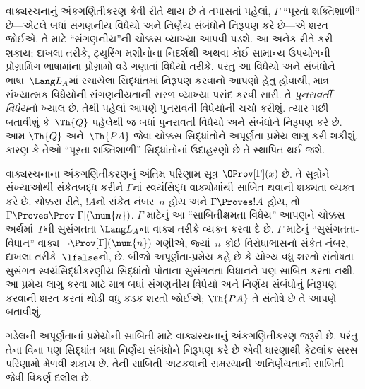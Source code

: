 વાક્યરચનાનું અંકગણિતીકરણ કેવી રીતે થાય છે
તે તપાસતાં પહેલાં, $\Gamma$ ``પૂરતો
શક્તિશાળી'' છે—એટલે બધાં સંગણનીય વિધેયો
અને નિર્ણેય સંબંધોને નિરૂપણ
કરે છે—એ શરત જોઈએ. તે માટે
``સંગણનીય''ની ચોક્કસ વ્યાખ્યા આપવી પડશે.
આ અનેક રીતે કરી શકાય; દાખલા તરીકે,
ટ્યુરિંગ મશીનોના નિદર્શથી અથવા કોઈ
સામાન્ય ઉપયોગની પ્રોગ્રામિંગ ભાષામાંના
પ્રોગ્રામો વડે ગણાતાં વિધેયો તરીકે. પરંતુ
આ વિધેયો અને સંબંધોને ભાષા~$\Lang L_A$માં
રચાયેલા સિદ્ધાંતમાં નિરૂપણ કરવાનો
આપણો હેતુ હોવાથી, માત્ર સંખ્યાત્મક વિધેયોની
સંગણનીયતાની સરળ વ્યાખ્યા પસંદ કરવી સારી.
તે \emph{પુનરાવર્તી વિધેય}નો ખ્યાલ છે.
તેથી પહેલાં આપણે પુનરાવર્તી વિધેયોની ચર્ચા
કરીશું. ત્યાર પછી બતાવીશું કે~$\Th{Q}$
પહેલેથી જ બધાં પુનરાવર્તી વિધેયો અને
સંબંધોને નિરૂપણ કરે છે. આમ
$\Th{Q}$ અને~$\Th{PA}$ જેવા ચોક્કસ
સિદ્ધાંતોને અપૂર્ણતા-પ્રમેય લાગુ કરી શકીશું,
કારણ કે તેઓ ``પૂરતા શક્તિશાળી'' સિદ્ધાંતોનાં
ઉદાહરણો છે તે સ્થાપિત થઈ જશે.

વાક્યરચનાના અંકગણિતીકરણનું અંતિમ પરિણામ
સૂત્ર $\OProv[\Gamma](x)$ છે. તે
સૂત્રોને સંખ્યાઓથી સંકેતબદ્ધ કરીને
$\Gamma$નાં સ્વયંસિદ્ધ વાક્યોમાંથી સાબિત
થવાની શક્યતા વ્યક્ત કરે છે. ચોક્કસ રીતે,
$!A$નો સંકેત નંબર~$n$ હોય અને
$\Gamma \Proves !A$ હોય, તો
$\Gamma \Proves \Prov[\Gamma](\num{n})$.
$\Gamma$ માટેનું આ ``સાબિતીક્ષમતા-વિધેય''
આપણને ચોક્કસ અર્થમાં~$\Gamma$ની સુસંગતતા
$\Lang L_A$ના વાક્ય તરીકે વ્યક્ત
કરવા દે છે. $\Gamma$ માટેનું
``સુસંગતતા-વિધાન'' વાક્ય
$\lnot \Prov[\Gamma](\num{n})$ ગણીએ,
જ્યાં~$n$ કોઈ વિરોધાભાસનો સંકેત નંબર,
દાખલા તરીકે~$\lfalse$નો, છે. બીજો
અપૂર્ણતા-પ્રમેય કહે છે કે યોગ્ય વધુ શરતો
સંતોષતા સુસંગત સ્વયંસિદ્ધીકરણીય સિદ્ધાંતો પોતાના
સુસંગતતા-વિધાનને પણ સાબિત કરતા નથી.
આ પ્રમેય લાગુ કરવા માટે માત્ર બધાં
સંગણનીય વિધેયો અને નિર્ણેય
સંબંધોનું નિરૂપણ કરવાની શરત કરતાં
થોડી વધુ કડક શરતો જોઈએ; $\Th{PA}$
તે સંતોષે છે તે આપણે બતાવીશું.
\endgroup


\begingroup
\makeatletter{}\makeatother


\label{guunit:OLP-0279}


ગડેલની અપૂર્ણતાનાં પ્રમેયોની સાબિતી માટે
વાક્યરચનાનું અંકગણિતીકરણ જરૂરી છે. પરંતુ
તેના વિના પણ સિદ્ધાંત બધા નિર્ણેય
સંબંધોને નિરૂપણ કરે છે એવી ધારણાથી
કેટલાંક સરસ પરિણામો મેળવી શકાય છે. તેની
સાબિતી અટકવાની સમસ્યાની અનિર્ણેયતાની
સાબિતી જેવી વિકર્ણ દલીલ છે.


